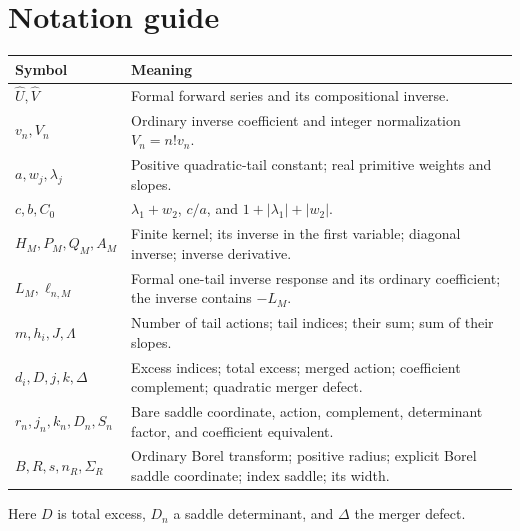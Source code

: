\documentclass[11pt,a4paper]{article}
\numberwithin{equation}{section}
\theoremstyle{definition}
\theoremstyle{remark}\newtheorem{remark}[theorem]{Remark}
\newcommand{\U}{\widehat U}\newcommand{\V}{\widehat V}
\begin{document}
\section{Notation guide}
\begin{longtable}{>{\raggedright\arraybackslash}p{}>{\raggedright\arraybackslash}p{}}
\toprule Symbol & Meaning\\\midrule\endhead
$\U,\V$ & Formal forward series and its compositional inverse.\\[4pt]
$v_n,V_n$ & Ordinary inverse coefficient and integer normalization $V_n=n!v_n$.\\[4pt]
$a,w_j,\lambda_j$ & Positive quadratic-tail constant; real primitive weights and slopes.\\[4pt]
$c,b,C_0$ & $\lambda_1+w_2$, $c/a$, and $1+|\lambda_1|+|w_2|$.\\[4pt]
$H_M,P_M,Q_M,A_M$ & Finite kernel; its inverse in the first variable; diagonal inverse; inverse derivative.\\[4pt]
$L_M,\ell_{n,M}$ & Formal one-tail inverse response and its ordinary coefficient; the inverse contains $-L_M$.\\[4pt]
$m,h_i,J,\Lambda$ & Number of tail actions; tail indices; their sum; sum of their slopes.\\[4pt]
$d_i,D,j,k,\Delta$ & Excess indices; total excess; merged action; coefficient complement; quadratic merger defect.\\[4pt]
$r_n,j_n,k_n,D_n,S_n$ & Bare saddle coordinate, action, complement, determinant factor, and coefficient equivalent.\\[4pt]
$B,R,s,n_R,\Sigma_R$ & Ordinary Borel transform; positive radius; explicit Borel saddle coordinate; index saddle; its width.\\\bottomrule
\end{longtable}
Here $D$ is total excess, $D_n$ a saddle determinant, and $\Delta$ the merger defect.
\end{document}
